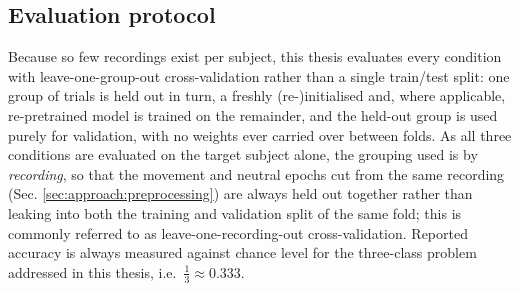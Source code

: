 \subsection{Evaluation protocol}
\label{sec:approach:evaluation}

Because so few recordings exist per subject, this thesis evaluates every condition with leave-one-group-out cross-validation rather than a single train/test split: one group of trials is held out in turn, a freshly (re-)initialised and, where applicable, re-pretrained model is trained on the remainder, and the held-out group is used purely for validation, with no weights ever carried over between folds. As all three conditions are evaluated on the target subject alone, the grouping used is by \emph{recording}, so that the movement and neutral epochs cut from the same recording (Sec. \ref{sec:approach:preprocessing}) are always held out together rather than leaking into both the training and validation split of the same fold; this is commonly referred to as leave-one-recording-out cross-validation. Reported accuracy is always measured against chance level for the three-class problem addressed in this thesis, i.e.\ $\frac{1}{3} \approx 0.333$.

